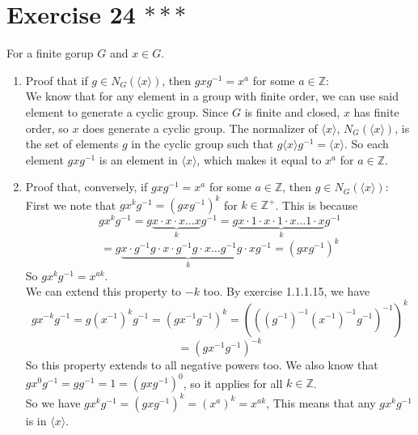 \documentclass{article}
\newcommand{\Z}{\mathbb{Z}}
\begin{document}
    \section*{Exercise 24 $***$}
    For a finite gorup $G$ and $x \in G$. \\
    \begin{enumerate}[label=\textbf{\alph*.}]
        \item 
            Proof that if $g \in N_G(\langle x \rangle)$,
            then $gxg^{-1} = x^a$ for some $a \in \Z$: \\
            We know that for any element in a group with finite order,
            we can use said element to generate a cyclic group.
            Since $G$ is finite and closed,
            $x$ has finite order,
            so $x$ does generate a cyclic group.
            The normalizer of $\langle x \rangle$,
            $N_G(\langle x \rangle)$,
            is the set of elements $g$ in the cyclic group
            such that $g\langle x \rangle g^{-1} = \langle x \rangle$.
            So each element $gxg^{-1}$
            is an element in $\langle x \rangle$,
            which makes it equal to $x^a$ for $a \in \Z$.
        \item
            Proof that, conversely, if $gxg^{-1} = x^a$
            for some $a \in \Z$,
            then $g \in N_G(\langle x \rangle)$: \\
            First we note that $gx^kg^{-1} = (gxg^{-1})^k$
            for $k \in \Z^+$.
            This is because
            \[ gx^kg^{-1}
            = g\underbrace{x \cdot x \cdot x \dots x}_{k}g^{-1} 
            = g\underbrace{x \cdot 1 \cdot x \cdot 1 \cdot x 
            \dots 1 \cdot x}_{k}g^{-1}  \]
            \[ = g\underbrace{x \cdot g^{-1}g \cdot x \cdot g^{-1}g \cdot x 
            \dots g^{-1}g \cdot x}_{k}g^{-1} 
            = (gxg^{-1})^k \]
            So $gx^kg^{-1} = x^{ak}$. \\
            We can extend this property to $-k$ too.
            By exercise 1.1.1.15, we have
            \[ gx^{-k}g^{-1} = g(x^{-1})^kg^{-1}
            =  (gx^{-1}g^{-1})^k
            = (((g^{-1})^{-1}(x^{-1})^{-1}g^{-1})^{-1})^k \]
            \[ = (gx^{-1}g^{-1})^{-k} \]
            So this property extends to all negative powers too.
            We also know that $gx^0g^{-1} = gg^{-1} = 1 = (gxg^{-1})^0$,
            so it applies for all $k \in \Z$. \\
            So we have $gx^kg^{-1} = (gxg^{-1})^k = (x^a)^k = x^{ak}$,
            This means that any $gx^kg^{-1}$ is in $\langle x \rangle$.

\end{enumerate}
\end{document}
